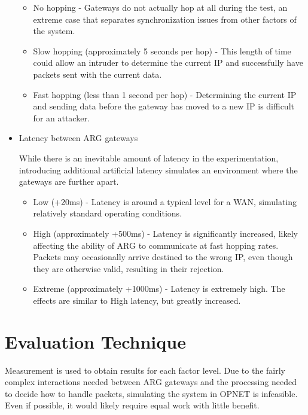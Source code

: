 \begin{itemize}
		\begin{itemize}
		\item No hopping - Gateways do not actually hop at all during the test, an extreme case that separates synchronization issues from other factors of the system.

		\item Slow hopping (approximately 5 seconds per hop) - This length of time could allow an intruder to determine the current \ac{IP} and successfully have packets sent with the current data.

		\item Fast hopping (less than 1 second per hop) - Determining the current \ac{IP} and sending data before the gateway has moved to a new \ac{IP} is difficult for an attacker.
		\end{itemize}

\item Latency between \ac{ARG} gateways
	\par While there is an inevitable amount of latency in the experimentation, introducing additional artificial latency simulates an environment where the gateways are further apart. 

		\begin{itemize}
		\item Low (+20ms) - Latency is around a typical level for a \ac{WAN}, simulating relatively standard operating conditions.

		\item High (approximately +500ms) - Latency is significantly increased, likely affecting the ability of \ac{ARG} to communicate at fast hopping rates. Packets may occasionally arrive destined to the wrong \ac{IP}, even though they are otherwise valid, resulting in their rejection.
		
		\item Extreme (approximately +1000ms) - Latency is extremely high. The effects are similar to High latency, but greatly increased.
		\end{itemize}
\end{itemize}

\section{Evaluation Technique}
\label{sec:eval_technique}
\par Measurement is used to obtain results for each factor level. Due to the fairly complex interactions needed between \ac{ARG} gateways and the processing needed to decide how to handle packets, simulating the system in OPNET is infeasible. Even if possible, it would likely require equal work with little benefit.

